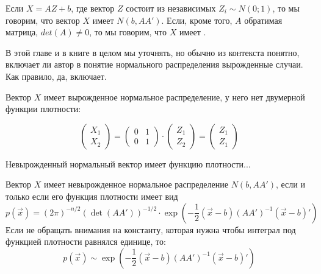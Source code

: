 \begin{mydef} \label{def:mult_norm}
Если $X=AZ+b$, где вектор $Z$ состоит из независимых $Z_{i}\sim N(0;1)$, то мы говорим, что вектор $X$ имеет  $N(b,AA')$. Если, кроме того, $A$ обратимая матрица, $det(A)\neq 0$, то мы говорим, что $X$ имеет .
\end{mydef}

В этой главе и в книге в целом мы  уточнять, но обычно из контекста понятно, включает ли автор в понятие нормального распределения вырожденные случаи. Как правило, да, включает.


\begin{myex}
Вектор $X$ имеет вырожденное нормальное распределение, у него нет двумерной функции плотности:

\begin{equation}
\left(\begin{array}{c} X_{1} \\ X_{2}  \end{array} \right)=
\left(\begin{array}{cc} 0 & 1 \\ 0 & 1  \end{array} \right)\cdot
\left(\begin{array}{c} Z_{1} \\ Z_{2}  \end{array} \right)=
\left(\begin{array}{c} Z_{1} \\ Z_{1}  \end{array} \right)
\end{equation}

\end{myex}



Невырожденный нормальный вектор имеет функцию плотности...
\begin{myth}
Вектор $X$ имеет невырожденное нормальное распределение $N(b,AA')$, если и только если его функция плотности имеет вид 
\begin{equation}
p(\vec{x})=(2\pi)^{-n/2}(\det(AA'))^{-1/2}\cdot \exp\left(-\frac{1}{2}(\vec{x}-b) (AA')^{-1} (\vec{x}-b)' \right) 
\end{equation}
Если не обращать внимания на константу, которая нужна чтобы интеграл под функцией плотности равнялся единице, то:
\begin{equation}
p(\vec{x})\sim \exp\left(-\frac{1}{2}(\vec{x}-b) (AA')^{-1} (\vec{x}-b)' \right) 
\end{equation}
\end{myth}

